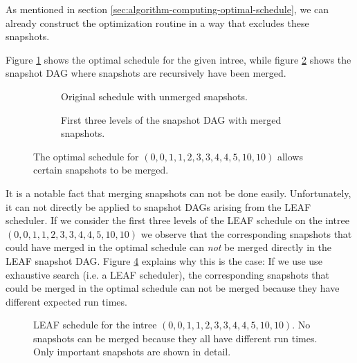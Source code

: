 As mentioned in section \ref{sec:algorithm-computing-optimal-schedule}, we can already construct the optimization routine in a way that excludes these snapshots.

Figure \ref{00112334451010-original-optimal-schedule} shows the optimal schedule for the given intree, while figure \ref{00112334451010-merged-optimal-schedule} shows the snapshot DAG where snapshots are recursively have been merged.

\begin{figure}[th]
  \centering
  \begin{subfigure}{.58\textwidth}
    \centering
    
    \caption{Original schedule with unmerged snapshots.}
    \label{00112334451010-original-optimal-schedule}
  \end{subfigure}
  \quad
  \begin{subfigure}{.3\textwidth}
    \centering
    
    \caption{First three levels of the snapshot DAG with merged snapshots.}
    \label{00112334451010-merged-optimal-schedule}
  \end{subfigure}
  \caption{The optimal schedule for $(0,0,1,1,2,3,3,4,4,5,10,10)$ allows certain snapshots to be merged.}
  \label{fig:p3-merge-snapshots-00112334451010}
\end{figure}

It is a notable fact that merging snapshots can not be done easily. Unfortunately, it can not directly be applied to snapshot DAGs arising from the LEAF scheduler. If we consider the first three levels of the LEAF schedule on the intree $(0,0,1,1,2,3,3,4,4,5,10,10)$ we observe that the corresponding snapshots that could have merged in the optimal schedule can \emph{not} be merged directly in the LEAF snapshot DAG. Figure \ref{fig:p3-00112334451010-leaf-schedule-no-merging} explains why this is the case: If we use use exhaustive search (i.e. a LEAF scheduler), the corresponding snapshots that could be merged in the optimal schedule can not be merged because they have different expected run times.

\begin{figure}[ht]
  \centering{}
  
  \caption{LEAF schedule for the intree $(0,0,1,1,2,3,3,4,4,5,10,10)$. No snapshots can be merged because they all have different run times. Only important snapshots are shown in detail.}
  \label{fig:p3-00112334451010-leaf-schedule-no-merging}
\end{figure}

